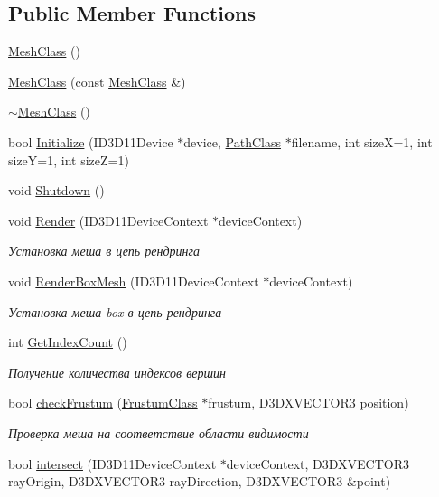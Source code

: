 \subsection*{Public Member Functions}
\begin{DoxyCompactItemize}
\item 
\hyperlink{class_mesh_class_ad4b527f72e1bb03475c0e2787feb02e3}{Mesh\+Class} ()
\item 
\hyperlink{class_mesh_class_aeeb396b4935649d8e0f60d63babe757b}{Mesh\+Class} (const \hyperlink{class_mesh_class}{Mesh\+Class} \&)
\item 
\hyperlink{class_mesh_class_ac819d21abb650939eb29702a6ac44462}{$\sim$\+Mesh\+Class} ()
\item 
bool \hyperlink{class_mesh_class_a5ea913605f7b16c509cfe7437d89495f}{Initialize} (I\+D3\+D11\+Device $\ast$device, \hyperlink{class_path_class}{Path\+Class} $\ast$filename, int sizeX=1, int sizeY=1, int sizeZ=1)
\item 
void \hyperlink{class_mesh_class_a9730e1855e06ba21d4b7fca72bee0816}{Shutdown} ()
\item 
void \hyperlink{class_mesh_class_a863828a039d453dc9d11f2775dc4a854}{Render} (I\+D3\+D11\+Device\+Context $\ast$device\+Context)
\begin{DoxyCompactList}\small\item\em Установка меша в цепь рендринга \end{DoxyCompactList}\item 
void \hyperlink{class_mesh_class_aa194aacaac0a3658a4b583df9002aaf4}{Render\+Box\+Mesh} (I\+D3\+D11\+Device\+Context $\ast$device\+Context)
\begin{DoxyCompactList}\small\item\em Установка меша box в цепь рендринга \end{DoxyCompactList}\item 
int \hyperlink{class_mesh_class_a36b81689c72db7acd226879125ba3a9c}{Get\+Index\+Count} ()
\begin{DoxyCompactList}\small\item\em Получение количества индексов вершин \end{DoxyCompactList}\item 
bool \hyperlink{class_mesh_class_a741b239a20d3a11f463b8953db5bda5e}{check\+Frustum} (\hyperlink{class_frustum_class}{Frustum\+Class} $\ast$frustum, D3\+D\+X\+V\+E\+C\+T\+O\+R3 position)
\begin{DoxyCompactList}\small\item\em Проверка меша на соответствие области видимости \end{DoxyCompactList}\item 
bool \hyperlink{class_mesh_class_a929236a79769290c108d1eebbffee6e8}{intersect} (I\+D3\+D11\+Device\+Context $\ast$device\+Context, D3\+D\+X\+V\+E\+C\+T\+O\+R3 ray\+Origin, D3\+D\+X\+V\+E\+C\+T\+O\+R3 ray\+Direction, D3\+D\+X\+V\+E\+C\+T\+O\+R3 \&point)
\end{DoxyCompactItemize}
